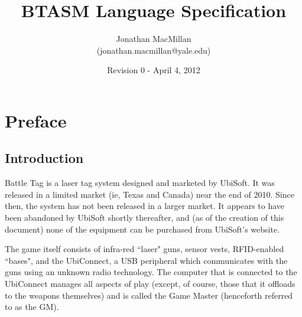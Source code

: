 \documentclass[12pt,a4paper]{scrbook}
\begin{document}
\title {BTASM Language Specification}
\date {Revision 0 - April 4, 2012}
\author {Jonathan MacMillan \\(jonathan.macmillan@yale.edu)}
\maketitle

\frontmatter
\setcounter{page}{1}
\tableofcontents


\chapter*{Preface}
\pagestyle{scrheadings}
\rohead{\thepage}
\lehead{\thepage}
\cfoot{}
\ofoot{}
\section*{Introduction}

Battle Tag is a laser tag system designed and marketed by UbiSoft.  It was released in a
limited market (ie, Texas and Canada) near the end of 2010.  Since then, the system has
not been released in a larger market.  It appears to have been abandoned by UbiSoft shortly
thereafter, and (as of the creation of this document) none of the equipment can be purchased
from UbiSoft's website.

The game itself consists of infra-red ``laser" guns, sensor vests, RFID-enabled ``bases", and
the UbiConnect, a USB peripheral which communicates with the guns using an unknown radio
technology.  The computer that is connected to the UbiConnect manages all aspects of play 
(except, of course, those that it offloads to the weapons themselves) and is called the Game
Master (henceforth referred to as the GM).
\end{document}
